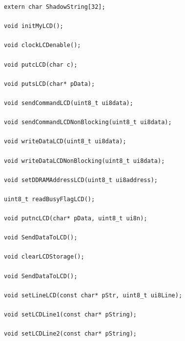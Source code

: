 \newpage
\begin{lstlisting}[frame=htrbl, caption={Funktionsprototypen edaPIC33LCD-Library}, label={lst:lcdlib}]
extern char ShadowString[32]; 

void initMyLCD();

void clockLCDenable();

void putcLCD(char c);

void putsLCD(char* pData);

void sendCommandLCD(uint8_t ui8data);

void sendCommandLCDNonBlocking(uint8_t ui8data);

void writeDataLCD(uint8_t ui8data);

void writeDataLCDNonBlocking(uint8_t ui8data);

void setDDRAMAddressLCD(uint8_t ui8address);

uint8_t readBusyFlagLCD();

void putncLCD(char* pData, uint8_t ui8n);

void SendDataToLCD();

void clearLCDStorage();

void SendDataToLCD();

void setLineLCD(const char* pStr, uint8_t ui8Line);

void setLCDLine1(const char* pString);

void setLCDLine2(const char* pString);

\end{lstlisting}
\newpage
